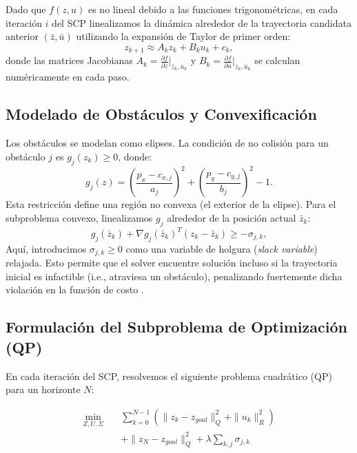 \documentclass[conference]{IEEEtran}
\begin{document}
Dado que $f(z,u)$ es no lineal debido a las funciones trigonométricas, en cada iteración $i$ del SCP linealizamos la dinámica alrededor de la trayectoria candidata anterior $(\bar{z}, \bar{u})$ utilizando la expansión de Taylor de primer orden:
\begin{equation}
z_{k+1} \approx A_k z_k + B_k u_k + c_k,
\end{equation}
donde las matrices Jacobianas $A_k = \frac{\partial f}{\partial z}|_{\bar{z}_k,\bar{u}_k}$ y $B_k = \frac{\partial f}{\partial u}|_{\bar{z}_k,\bar{u}_k}$ se calculan numéricamente en cada paso.

\subsection{Modelado de Obstáculos y Convexificación}
Los obstáculos se modelan como elipses. La condición de no colisión para un obstáculo $j$ es $g_j(z_k) \ge 0$, donde:
\begin{equation}
g_j(z) = \left(\frac{p_x - c_{x,j}}{a_j}\right)^2 + \left(\frac{p_y - c_{y,j}}{b_j}\right)^2 - 1.
\end{equation}
Esta restricción define una región no convexa (el exterior de la elipse). Para el subproblema convexo, linealizamos $g_j$ alrededor de la posición actual $\bar{z}_k$:
\begin{equation}
g_j(\bar{z}_k) + \nabla g_j(\bar{z}_k)^T (z_k - \bar{z}_k) \ge -\sigma_{j,k},
\end{equation}
Aquí, introducimos $\sigma_{j,k} \ge 0$ como una variable de holgura (\textit{slack variable}) relajada. Esto permite que el solver encuentre solución incluso si la trayectoria inicial es infactible (i.e., atraviesa un obstáculo), penalizando fuertemente dicha violación en la función de costo \cite{scvx_survey}.

\subsection{Formulación del Subproblema de Optimización (QP)}
En cada iteración del SCP, resolvemos el siguiente problema cuadrático (QP) para un horizonte $N$:

\begin{align}
\min_{Z, U, \Sigma} \quad & \sum_{k=0}^{N-1} \left( \|z_k - z_{goal}\|_Q^2 + \|u_k\|_R^2 \right) \nonumber \\
& + \|z_N - z_{goal}\|_Q^2 + \lambda \sum_{k,j} \sigma_{j,k}
\end{align}
\end{document}
